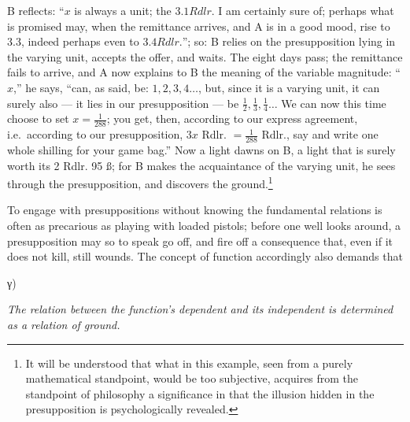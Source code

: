 \documentclass[12pt,a4paper,openany]{book}
\newcommand{\opage}[1]{\marginnote{\footnotesize\textit{[#1]}}}
\begin{document}
B reflects: ``$x$ is always a unit; the $3. 1 Rdlr.$ I am
certainly sure of; perhaps what is promised may, when the remittance
arrives, and A is in a good mood, rise to $3. 3$, indeed
perhaps even to $3. 4 Rdlr.$''; so: B relies on the presupposition
lying in the varying unit, accepts
the offer, and waits. The eight days pass; the remittance
fails to arrive, and A now explains to B the meaning of the
variable magnitude: ``$x$,'' he says, ``can, as said, be:
\setcounter{footnote}{0}%
\opage{9}$1, 2, 3, 4 \ldots$, but, since it is a varying unit, it can
surely also --- it lies in our presupposition --- be
$\frac{1}{2}, \frac{1}{3}, \frac{1}{4} \ldots$ We can now this time choose to set $x=\frac{1}{288}$; you get, then, according to our express agreement, i.e.\
according to our presupposition, $3x$ Rdlr. $= \frac{1}{288}$ Rdlr., say and %
write one whole shilling for your game bag.'' Now a
light dawns on B, a light that is surely worth its 2 Rdlr. 95 ß;
for B makes the acquaintance of the varying unit,
he sees through the presupposition, and discovers the ground.\footnote[1]{It will be understood that what in this example, seen from a purely mathematical standpoint, would be too subjective, acquires from the standpoint of philosophy a significance in that the illusion hidden in the presupposition is psychologically revealed.}

To engage with presuppositions without knowing the fundamental relations
is often as precarious as playing with
loaded pistols; before one well looks around, a presupposition
may so to speak go off, and fire off a consequence that,
even if it does not kill, still wounds. The concept of function
accordingly also demands that

\begin{center}γ)

\emph{The relation between the function's dependent and its independent is determined as a relation of ground.}\end{center}
\end{document}
